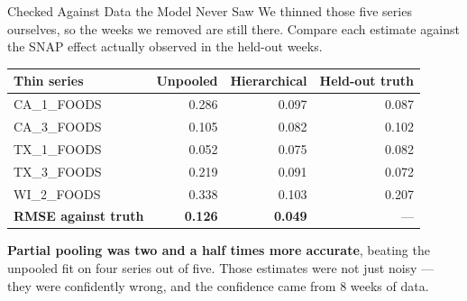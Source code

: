 \documentclass[aspectratio=169, 11pt]{beamer}
\begin{document}
\begin{frame}{Checked Against Data the Model Never Saw}
  We thinned those five series ourselves, so the weeks we removed are still there. Compare each
  estimate against the SNAP effect actually observed in the held-out weeks.

  \begin{center}
    {\small
    \begin{tabular}{lrrr}
      \toprule
      \textbf{Thin series} & \textbf{Unpooled} & \textbf{Hierarchical} & \textbf{Held-out truth} \\
      \midrule
      CA\_1\_FOODS & 0.286 & 0.097 & 0.087 \\
      CA\_3\_FOODS & 0.105 & 0.082 & 0.102 \\
      TX\_1\_FOODS & 0.052 & 0.075 & 0.082 \\
      TX\_3\_FOODS & 0.219 & 0.091 & 0.072 \\
      WI\_2\_FOODS & 0.338 & 0.103 & 0.207 \\
      \midrule
      \textbf{RMSE against truth} & \textbf{0.126} & \textbf{0.049} & --- \\
      \bottomrule
    \end{tabular}
    }
  \end{center}

  \vspace{-0.05cm}
  \textbf{Partial pooling was two and a half times more accurate}, beating the unpooled fit on
  four series out of five. Those estimates were not just noisy --- they were confidently wrong,
  and the confidence came from 8 weeks of data.

  \vspace{0.05cm}
\end{frame}
\end{document}
